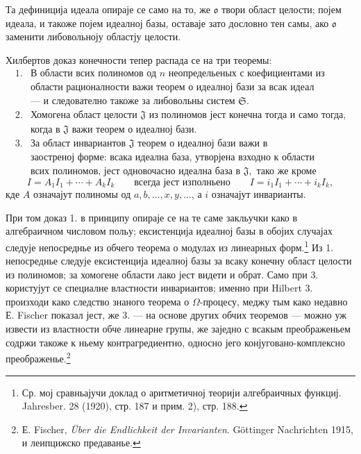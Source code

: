 ﻿\documentclass[11pt]{article}
\providecommand{\mJ}{\mathfrak J}
\providecommand{\mS}{\mathfrak S}
\providecommand{\mo}{\mathfrak o}
\begin{document}
Та дефиниција идеала опираје се само на то, же $\mo$ твори област целости; појем идеала, и такоже појем идеалној базы, оставаје зато дословно тен самы, ако $\mo$ заменити либовольноју областју целости.

Хилбертов доказ конечности тепер распада се на три теоремы:
\[
\begin{array}{ll}
1.& \text{В области всих полиномов од }n\text{ неопредельеных с коефициентами из}\\
& \text{области рационалности важи теорем о идеалној бази за всак идеал}\\
& \text{--- и следователно такоже за либовольны систем }\mS.\\[2pt]
2.& \text{Хомогена област целости }\mJ\text{ из полиномов јест конечна тогда и само тогда,}\\
& \text{когда в }\mJ\text{ важи теорем о идеалној бази.}\\[2pt]
3.& \text{За област инвариантов }\mJ\text{ теорем о идеалној бази важи в}\\
& \text{заостреној форме: всака идеална база, утворјена взходно к области}\\
& \text{всих полиномов, јест одновочасно идеална база в }\mJ,\text{ тако же кроме}
\end{array}
\]
\[
 I=A_1I_1+\cdots+A_kI_k
 \qquad\text{всегда јест изполньено}\qquad
 I=i_1I_1+\cdots+i_kI_k,
\]
кде $A$ означајут полиномы од $a,b,\ldots,x,y,\ldots$, а $i$ означајут инварианты.

При том доказ 1. в принципу опираје се на те саме закльучки како в алгебраичном числовом польу; ексистенција идеалној базы в обојих случајах следује непосреднье из обчего теорема о модулах из линеарных форм.\footnote{Ср. мој сравньајучи доклад о аритметичној теорији алгебраичных функциј. Jahresber. 28 (1920), стр. 187 и прим. 2), стр. 188.} Из 1. непосреднье следује ексистенција идеалној базы за всаку конечну област целости из полиномов; за хомогене области лако јест видети и обрат. Само при 3. користујут се специалне властности инвариантов; именно при Hilbert 3. произходи како следство знаного теорема о $\Omega$-процесу, меджу тым како недавно Е. Fischer показал јест, же 3. --- на основе других обчих теоремов --- можно уж извести из властности обче линеарне групы, же заједно с всакым преображеньем содржи такоже к ньему контрагредиентно, односно јего конјуговано-комплексно преображенье.\footnote{Е. Fischer, \emph{Über die Endlichkeit der Invarianten}. Göttinger Nachrichten 1915, и леипцижско предаванье.}
\end{document}
